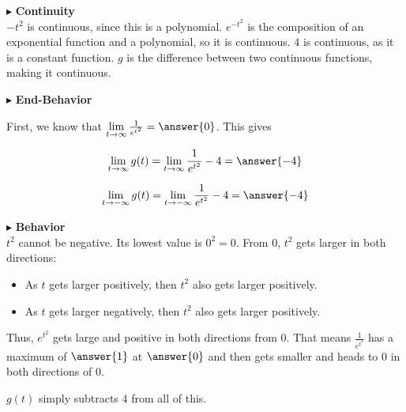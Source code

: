 \documentclass{ximera}
\begin{document}
$\blacktriangleright$  \textbf{\textcolor{blue!55!black}{Continuity}} \\


$-t^2$ is continuous, since this is a polynomial.  $e^{-t^2}$ is the composition of an exponential function and a polynomial, so it is continuous. $4$ is continuous, as it is a constant function. $g$ is the difference between two continuous functions, making it continuous.






$\blacktriangleright$  \textbf{\textcolor{blue!55!black}{End-Behavior}} \\

\begin{explanation}

First, we know that $\lim\limits_{t \to \infty}  \frac{1}{e^{t^2}} = \answer{0}$.  This gives


\[   \lim\limits_{t \to \infty} g(t) =  \lim\limits_{t \to \infty}  \frac{1}{e^{t^2}} - 4 = \answer{-4} \]


\[   \lim\limits_{t \to -\infty} g(t) =  \lim\limits_{t \to -\infty}  \frac{1}{e^{t^2}} - 4 = \answer{-4} \]


\end{explanation}


$\blacktriangleright$  \textbf{\textcolor{blue!55!black}{Behavior}} \\


$t^2$ cannot be negative. Its lowest value is $0^2 = 0$.  From $0$, $t^2$ gets larger in both directions:  


\begin{itemize}
\item As $t$ gets larger positively, then $t^2$ also gets larger positively.
\item As $t$ gets larger negatively, then $t^2$ also gets larger positively.
\end{itemize}


\begin{conclusion}

Thus, $e^{t^2}$ gets large and positive in both directions from $0$.  That means  $\frac{1}{e^{t^2}}$ has a maximum of $\answer{1}$ at $\answer{0}$ and then gets smaller and heads to $0$ in both directions of $0$. \\

\end{conclusion}



$g(t)$ simply subtracts $4$ from all of this.
\end{document}
